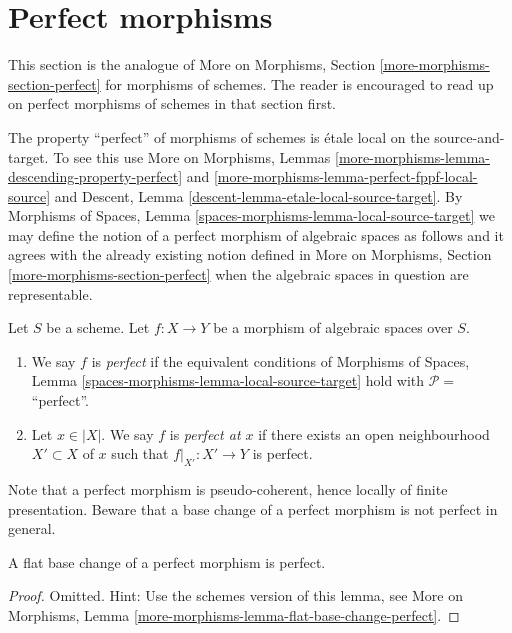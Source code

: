 \section{Perfect morphisms}
\label{section-perfect}

\noindent
This section is the analogue of
More on Morphisms, Section \ref{more-morphisms-section-perfect}
for morphisms of schemes. The reader is encouraged to read up
on perfect morphisms of schemes in that section first.

\medskip\noindent
The property ``perfect'' of morphisms of schemes is
\'etale local on the source-and-target. To see this use
More on Morphisms,
Lemmas \ref{more-morphisms-lemma-descending-property-perfect} and
\ref{more-morphisms-lemma-perfect-fppf-local-source}
and
Descent, Lemma \ref{descent-lemma-etale-local-source-target}.
By
Morphisms of Spaces,
Lemma \ref{spaces-morphisms-lemma-local-source-target}
we may define the notion of a perfect morphism of algebraic spaces as
follows and it agrees with the already existing notion defined in
More on Morphisms, Section \ref{more-morphisms-section-perfect}
when the algebraic spaces in question are representable.

\begin{definition}
\label{definition-perfect}
Let $S$ be a scheme.
Let $f : X \to Y$ be a morphism of algebraic spaces over $S$.
\begin{enumerate}
\item We say $f$ is {\it perfect} if the equivalent conditions of
Morphisms of Spaces, Lemma \ref{spaces-morphisms-lemma-local-source-target}
hold with $\mathcal{P} =$``perfect''.
\item Let $x \in |X|$. We say $f$ is {\it perfect at $x$} if
there exists an open neighbourhood $X' \subset X$ of $x$ such
that $f|_{X'} : X' \to Y$ is perfect.
\end{enumerate}
\end{definition}

\noindent
Note that a perfect morphism is pseudo-coherent, hence locally of finite
presentation. Beware that a base change of a perfect morphism is not perfect
in general.

\begin{lemma}
\label{lemma-flat-base-change-perfect}
A flat base change of a perfect morphism is perfect.
\end{lemma}

\begin{proof}
Omitted. Hint: Use the schemes version of this lemma, see
More on Morphisms,
Lemma \ref{more-morphisms-lemma-flat-base-change-perfect}.
\end{proof}

